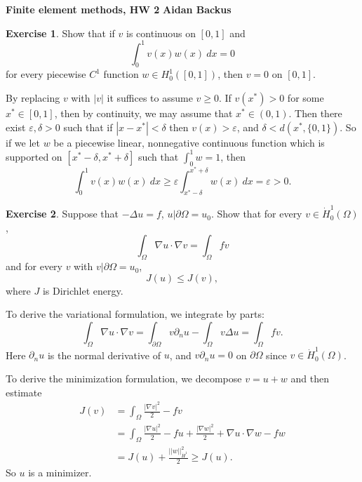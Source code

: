 \documentclass[10pt]{article}
\theoremstyle{definition}
\newtheorem{exer}{Exercise}
\begin{document}
\noindent
\large\textbf{Finite element methods, HW 2} \hfill \textbf{Aidan Backus} \\

\begin{exer}
    Show that if $v$ is continuous on $[0, 1]$ and 
    $$\int_0^1 v(x) w(x) ~dx = 0$$
    for every piecewise $C^1$ function $w \in H^1_0([0, 1])$, then $v = 0$ on $[0, 1]$.
\end{exer}

By replacing $v$ with $|v|$ it suffices to assume $v \geq 0$.
If $v(x^*) > 0$ for some $x^* \in [0, 1]$, then by continuity, we may assume that $x^* \in (0, 1)$.
Then there exist $\varepsilon, \delta > 0$ such that if $|x - x^*| < \delta$ then $v(x) > \varepsilon$, and $\delta < d(x^*, \{0, 1\})$.
So if we let $w$ be a piecewise linear, nonnegative continuous function which is supported on $[x^* - \delta, x^* + \delta]$ such that $\int_0^1 w = 1$, then 
$$\int_0^1 v(x) w(x) ~dx \geq \varepsilon \int_{x^* - \delta}^{x^* + \delta} w(x) ~dx = \varepsilon > 0.$$

\begin{exer}
    Suppose that $-\Delta u = f$, $u|\partial \Omega = u_0$. Show that for every $v \in \dot H^1_0(\Omega)$,
    $$\int_\Omega \nabla u \cdot \nabla v = \int_\Omega fv$$
    and for every $v$ with $v|\partial \Omega = u_0$,
    $$J(u) \leq J(v),$$
    where $J$ is Dirichlet energy.
\end{exer}

To derive the variational formulation, we integrate by parts:
$$\int_\Omega \nabla u \cdot \nabla v = \int_{\partial \Omega} v\partial_n u - \int_\Omega v\Delta u = \int_\Omega fv.$$
Here $\partial_n u$ is the normal derivative of $u$, and $v\partial_n u = 0$ on $\partial \Omega$ since $v \in \dot H^1_0(\Omega)$.

To derive the minimization formulation, we decompose $v = u + w$ and then estimate 
\begin{align*}
J(v) &= \int_\Omega \frac{|\nabla v|^2}{2} - fv\\
&= \int_\Omega \frac{|\nabla u|^2}{2} - fu + \frac{|\nabla w|^2}{2} + \nabla u \cdot \nabla w - fw\\
&= J(u) + \frac{||w||_{\dot H^1}^2}{2} \geq J(u).
\end{align*}
So $u$ is a minimizer.
\end{document}
